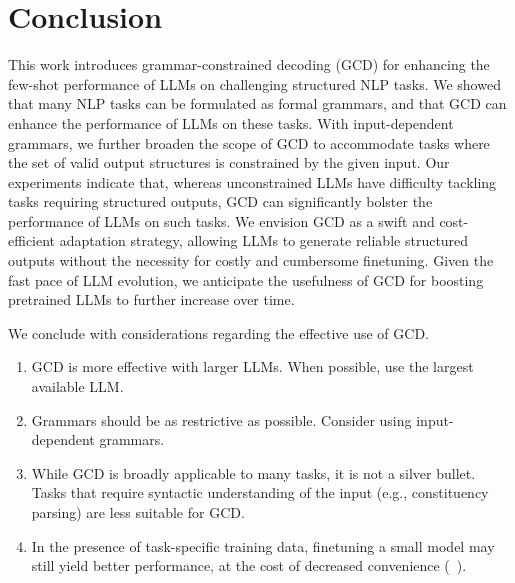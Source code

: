 

\section{Conclusion}
This work introduces grammar-constrained decoding (GCD) for enhancing the few-shot performance of LLMs on challenging structured NLP tasks.
We showed that many NLP tasks can be formulated as formal grammars, and that GCD can enhance the performance of LLMs on these tasks.
With input-dependent grammars, we further broaden the scope of GCD to accommodate tasks where the set of valid output structures is constrained by the given input.
Our experiments indicate that, whereas unconstrained LLMs have difficulty tackling tasks requiring structured outputs, GCD can significantly bolster the performance of LLMs on such tasks.
We envision GCD as a swift and cost-efficient adaptation strategy, allowing LLMs to generate reliable structured outputs without the necessity for costly and cumbersome finetuning.
Given the fast pace of LLM evolution, we anticipate the usefulness of GCD for boosting pretrained LLMs to further increase over time.

We conclude with considerations regarding the effective use of GCD.

\begin{enumerate}
    \denselist
    \item
    GCD is more effective with larger LLMs. When possible, use the largest available LLM.
    \item Grammars should be as restrictive as possible. Consider using input\hyp dependent grammars.
    \item While GCD is broadly applicable to many tasks, it is not a silver bullet. Tasks that require syntactic understanding of the input (e.g., constituency parsing) are less suitable for GCD.
    \item In the presence of task\hyp specific training data, finetuning a small model may still yield better performance, at the cost of decreased convenience (\cf\ ).
\end{enumerate}

